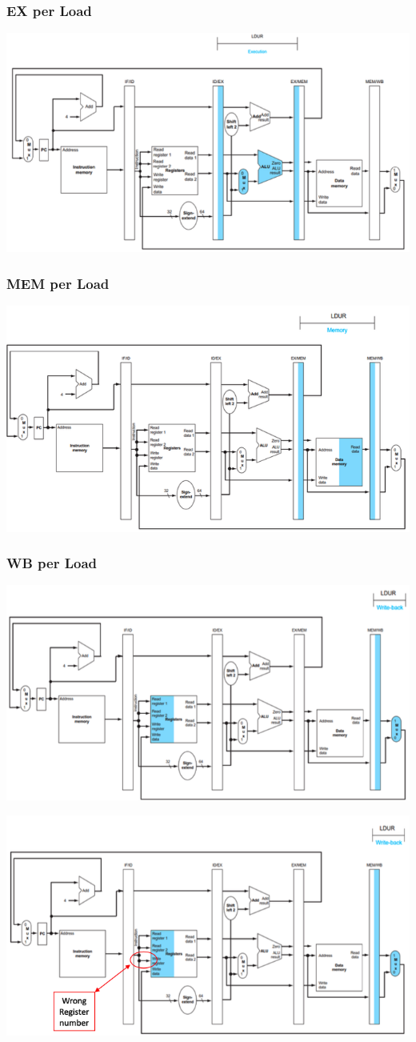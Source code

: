 \documentclass[12pt,a4paper]{article}
\begin{document}
\subsubsection{EX per Load}
\begin{center}
\includegraphics[width=0.6\columnwidth]{img/pipeline_ex.png}
\end{center}

\subsubsection{MEM per Load}
\begin{center}
\includegraphics[width=0.6\columnwidth]{img/pipeline_mem.png}
\end{center}

\subsubsection{WB per Load}
\begin{center}
\includegraphics[width=0.6\columnwidth]{img/pipeline_wb.png}
\end{center}
\begin{center}
\includegraphics[width=0.6\columnwidth]{img/pipeline_wb_bis.png}
\end{center}
\end{document}
